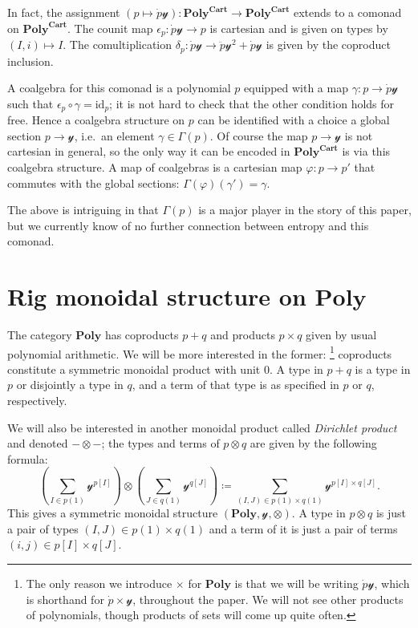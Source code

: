 \documentclass[11pt, one side, article]{memoir}
\theoremstyle{definition}
\theoremstyle{plain}
\newenvironment{remark}
  {\pushQED{\qed}\renewcommand{\qedsymbol}{$\lozenge$}\remarkx}
  {\popQED\endremarkx}
\newcommand{\Cat}[1]{\mathbf{#1}}%
\newcommand{\id}{\mathrm{id}}
\newcommand{\yon}{\mathcal{y}}
\newcommand{\poly}{\Cat{Poly}}
\newcommand{\polycart}{\poly^{\Cat{Cart}}}
\newcommand{\0}{\textsf{0}}
\newcommand{\1}{\tn{\textsf{1}}}
\begin{document}
\begin{remark}\label{rem.comonad}
In fact, the assignment $(p\mapsto\dot{p}\yon)\colon\polycart\to\polycart$ extends to a comonad on $\polycart$. The counit map $\epsilon_p\colon\dot{p}\yon\to p$ is cartesian and is given on types by $(I,i)\mapsto I$. The comultiplication $\delta_p\colon\dot{p}\yon\to\ddot{p}\yon^2+\dot{p}\yon$ is given by the coproduct inclusion.

A coalgebra for this comonad is a polynomial $p$ equipped with a map $\gamma\colon p\to\dot{p}\yon$ such that $\epsilon_p\circ\gamma=\id_p$; it is not hard to check that the other condition holds for free. Hence a coalgebra structure on $p$ can be identified with a choice a global section $p\to\yon$, i.e.\ an element $\gamma\in\Gamma(p)$. Of course the map $p\to\yon$ is not cartesian in general, so the only way it can be encoded in $\polycart$ is via this coalgebra structure. A map of coalgebras is a cartesian map $\varphi\colon p\to p'$ that commutes with the global sections: $\Gamma(\varphi)(\gamma')=\gamma$.

The above is intriguing in that $\Gamma(p)$ is a major player in the story of this paper, but we currently know of no further connection between entropy and this comonad. 
\end{remark}

\section{Rig monoidal structure on $\poly$}

The category $\poly$ has coproducts $p+q$ and products $p\times q$ given by usual polynomial arithmetic. We will be more interested in the former:%
\footnote{
The only reason we introduce $\times$ for $\poly$ is that we will be writing $\dot{p}\yon$, which is shorthand for $\dot{p}\times\yon$, throughout the paper. We will not see other products of polynomials, though products of sets will come up quite often.
}
coproducts constitute a symmetric monoidal product with unit $0$. A type in $p+q$ is a type in $p$ or disjointly a type in $q$, and a term of that type is as specified in $p$ or $q$, respectively.

We will also be interested in another monoidal product called \emph{Dirichlet product} and denoted $-\otimes-$; the types and terms of $p\otimes q$ are given by the following formula:
\begin{equation}\label{eqn.dir_formula}
  \left(\sum_{I\in p(1)}\yon^{p[I]}\right)\otimes
  \left(\sum_{J\in q(1)}\yon^{q[J]}\right)\coloneqq
  \sum_{(I,J)\in p(1)\times q(1)}\yon^{p[I]\times q[J]}.
\end{equation}
This gives a symmetric monoidal structure $(\poly,\yon,\otimes)$. A type in $p\otimes q$ is just a pair of types $(I,J)\in p(1)\times q(1)$ and a term of it is just a pair of terms $(i,j)\in p[I]\times q[J]$.
\end{document}

